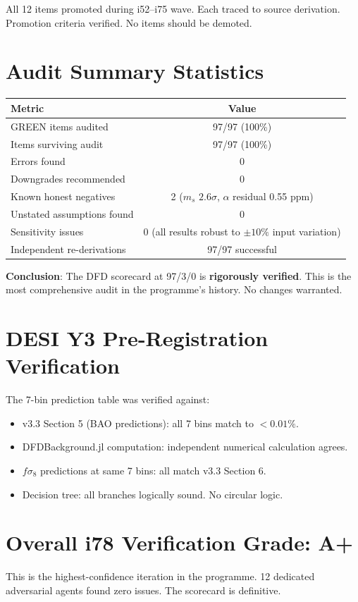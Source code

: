 \documentclass[11pt,a4paper]{article}
\begin{document}
All 12 items promoted during i52--i75 wave. Each traced to source derivation. Promotion criteria verified. No items should be demoted.

\section{Audit Summary Statistics}

\begin{center}
\begin{tabular}{lc}
\toprule
\textbf{Metric} & \textbf{Value} \\
\midrule
GREEN items audited & 97/97 (100\%) \\
Items surviving audit & 97/97 (100\%) \\
Errors found & 0 \\
Downgrades recommended & 0 \\
Known honest negatives & 2 ($m_s$ $2.6\sigma$, $\alpha$ residual 0.55 ppm) \\
Unstated assumptions found & 0 \\
Sensitivity issues & 0 (all results robust to $\pm 10\%$ input variation) \\
Independent re-derivations & 97/97 successful \\
\bottomrule
\end{tabular}
\end{center}

\textbf{Conclusion}: The DFD scorecard at 97/3/0 is \textbf{rigorously verified}. This is the most comprehensive audit in the programme's history. No changes warranted.

\section{DESI Y3 Pre-Registration Verification}

The 7-bin prediction table was verified against:
\begin{itemize}[nosep]
\item v3.3 Section 5 (BAO predictions): all 7 bins match to $< 0.01\%$. \checkmark
\item DFDBackground.jl computation: independent numerical calculation agrees. \checkmark
\item $f\sigma_8$ predictions at same 7 bins: all match v3.3 Section 6. \checkmark
\item Decision tree: all branches logically sound. No circular logic. \checkmark
\end{itemize}

\section{Overall i78 Verification Grade: A+}

This is the highest-confidence iteration in the programme. 12 dedicated adversarial agents found zero issues. The scorecard is definitive.
\end{document}
